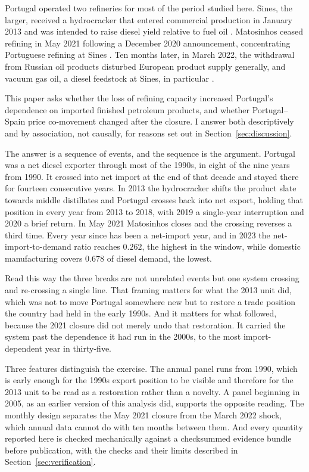\documentclass[11pt,a4paper]{article}
\begin{document}
Portugal operated two refineries for most of the period studied here. Sines, the larger,
received a hydrocracker that entered commercial production in January 2013 and was intended to
raise diesel yield relative to fuel oil \citep{galphydrocracker}. Matosinhos ceased refining in
May 2021 following a December 2020 announcement, concentrating Portuguese refining at Sines
\citep{galpmatosinhos}. Ten months later, in March 2022, the withdrawal from Russian oil
products disturbed European product supply generally, and vacuum gas oil, a diesel feedstock at
Sines, in particular \citep{galprussian}.

This paper asks whether the loss of refining capacity increased Portugal's dependence on
imported finished petroleum products, and whether Portugal--Spain price co-movement changed
after the closure. I answer both descriptively and by association, not causally, for reasons set
out in Section~\ref{sec:discussion}.

The answer is a sequence of events, and the sequence is the argument. Portugal was a net diesel
exporter through most of the 1990s, in eight of the nine years from 1990. It crossed into net
import at the end of that decade and stayed there for fourteen consecutive years. In 2013 the
hydrocracker shifts the product slate towards middle distillates and Portugal crosses back into
net export, holding that position in every year from 2013 to 2018, with 2019 a single-year
interruption and 2020 a brief return. In May 2021 Matosinhos closes and the crossing reverses a
third time. Every year since has been a net-import year, and in 2023 the net-import-to-demand
ratio reaches $0.262$, the highest in the window, while domestic manufacturing covers $0.678$ of
diesel demand, the lowest.

Read this way the three breaks are not unrelated events but one system crossing and re-crossing
a single line. That framing matters for what the 2013 unit did, which was not to move
Portugal somewhere new but to restore a trade position the country had held in the early
1990s. And it
matters for what followed, because the 2021 closure did not merely undo that restoration. It
carried the system past the dependence it had run in the 2000s, to the most import-dependent
year in thirty-five.

Three features distinguish the exercise. The annual panel runs from 1990, which is early enough
for the 1990s export position to be visible and therefore for the 2013 unit to be read as a
restoration rather than a novelty. A panel beginning in 2005, as an earlier version of this
analysis did, supports the opposite reading. The monthly design separates the May 2021 closure
from the March 2022 shock, which annual data cannot do with ten months between them. And every
quantity reported here is checked mechanically against a checksummed evidence bundle before
publication, with the checks and their limits described in Section~\ref{sec:verification}.
\end{document}
